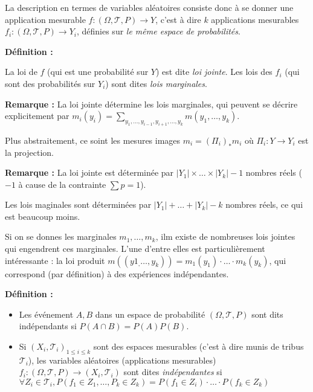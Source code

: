 \documentclass[10pt,a4paper,notitlepage ]{report}
\newenvironment{definition}{
	
	\textbf{Définition : }
}
{}
\newcounter{th}
\newenvironment{rem}{
	
	\textbf{Remarque :}}{}
\begin{document}
La description en termes de variables aléatoires consiste donc à se donner une application mesurable $f : (\Omega, \mathcal T, P) \rightarrow Y$, c'est à dire $k$ applications mesurables $f_i : (\Omega, \mathcal T, P) \rightarrow Y_i$, définies sur \emph{le même espace de probabilités}.

\begin{definition}
	La loi de $f$ (qui est une probabilité sur $Y$) est dite \emph{loi jointe}. Les lois des $f_i$ (qui sont des probabilités sur $Y_i$) sont dites \emph{lois marginales}.
\end{definition}

\begin{rem}
	La loi jointe détermine les lois marginales, qui peuvent se décrire explicitement par $m_i(y_i)=\underset{y_1,\dots,y_{i-1},y_{i+1},\dots,y_k}{\sum} m(y_1,\dots,y_k)$.
	
	Plus abstraitement, ce soint les mesures images $m_i=(\Pi_i)_*m_i$ où $\Pi_i : Y \rightarrow Y_i$ est la projection.
\end{rem}

\begin{rem}
	La loi jointe est déterminée par $|Y_1|\times\dots\times |Y_k| - 1$ nombres réels ($-1$ à cause de la contrainte $\sum p = 1$).
	
	Les lois maginales sont déterminées par $|Y_1| + \dots + |Y_k| - k$ nombres réels, ce qui est beaucoup moins.
\end{rem}

Si on se donnes les marginales $m_1, \dots, m_k$, ilm existe de nombreuses lois jointes qui engendrent ces marginales. L'une d'entre elles est particulièrement intéressante : la loi produit $m((y1_,\dots,y_k))=m_1(y_1) \cdot \dots \cdot m_k(y_k)$, qui correspond (par définition) à des expériences indépendantes.

\begin{definition}
	\begin{itemize}
		\item Les événement $A,B$ dans un espace de probabilité $(\Omega,\mathcal T, P)$ sont dits indépendants si $P(A\cap B) = P(A)P(B)$.
		\item Si $(X_i, \mathcal T_i)_{1\le i\le k}$ sont des espaces mesurables (c'est à dire munis de tribus $\mathcal T_i$), les variables aléatoires (applications mesurables) $f_i : (\Omega,\mathcal T, P) \rightarrow (X_i,\mathcal T_i)$ sont dites \emph{indépendantes} si $\forall Z_i \in \mathcal T_i, P(f_1\in Z_1, \dots, P_k \in Z_k) = P(f_1 \in Z_i) \cdot \dots \cdot P(f_k \in Z_k)$
	\end{itemize}
\end{definition}
\end{document}
